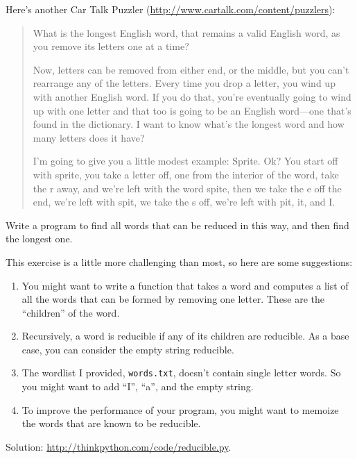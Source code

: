 \documentclass[10pt]{book}
\begin{document}
\begin{exercise}

Here's another Car Talk Puzzler
(\url{http://www.cartalk.com/content/puzzlers}):

\begin{quote}
What is the longest English word, that remains a valid English word,
as you remove its letters one at a time?

Now, letters can be removed from either end, or the middle, but you
can't rearrange any of the letters. Every time you drop a letter, you
wind up with another English word. If you do that, you're eventually
going to wind up with one letter and that too is going to be an
English word---one that's found in the dictionary. I want to know
what's the longest word and how many letters does it
have?

I'm going to give you a little modest example: Sprite. Ok? You start
off with sprite, you take a letter off, one from the interior of the
word, take the r away, and we're left with the word spite, then we
take the e off the end, we're left with spit, we take the s off, we're
left with pit, it, and I.
\end{quote}

Write a program to find all words that can be reduced in this way,
and then find the longest one.

This exercise is a little more challenging than most, so here are
some suggestions:

\begin{enumerate}

\item You might want to write a function that takes a word and
  computes a list of all the words that can be formed by removing one
  letter.  These are the ``children'' of the word.

\item Recursively, a word is reducible if any of its children
are reducible.  As a base case, you can consider the empty
string reducible.

\item The wordlist I provided, {\tt words.txt}, doesn't
contain single letter words.  So you might want to add
``I'', ``a'', and the empty string.

\item To improve the performance of your program, you might want
to memoize the words that are known to be reducible.

\end{enumerate}

Solution: \url{http://thinkpython.com/code/reducible.py}.

\end{exercise}
\end{document}
